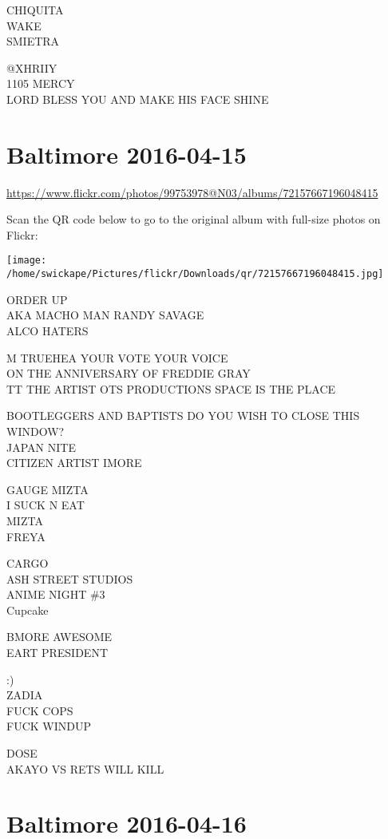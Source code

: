 \documentclass[10pt,letterpaper]{article}
\begin{document}
CHIQUITA\\
WAKE\\
SMIETRA

@XHRIIY\\
1105 MERCY\\
LORD BLESS YOU AND MAKE HIS FACE SHINE


\section*{Baltimore 2016-04-15}

\url{https://www.flickr.com/photos/99753978@N03/albums/72157667196048415}

Scan the QR code below to go to the original album with full-size photos on Flickr:

\texttt{[image: /home/swickape/Pictures/flickr/Downloads/qr/72157667196048415.jpg]}


ORDER UP\\
AKA MACHO MAN RANDY SAVAGE\\
ALCO HATERS

M TRUEHEA YOUR VOTE YOUR VOICE\\
ON THE ANNIVERSARY OF FREDDIE GRAY\\
TT THE ARTIST OTS PRODUCTIONS SPACE IS THE PLACE

BOOTLEGGERS AND BAPTISTS DO YOU WISH TO CLOSE THIS WINDOW?\\
JAPAN NITE\\
CITIZEN ARTIST IMORE

GAUGE MIZTA\\
I SUCK N EAT\\
MIZTA\\
FREYA

CARGO\\
ASH STREET STUDIOS\\
ANIME NIGHT \#3\\
Cupcake

BMORE AWESOME\\
EART PRESIDENT

:)\\
ZADIA\\
FUCK COPS\\
FUCK WINDUP

DOSE\\
AKAYO VS RETS WILL KILL


\section*{Baltimore 2016-04-16}
\end{document}
